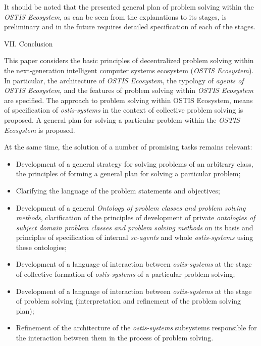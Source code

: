 \documentclass[9pt, letterpaper]{article}
\begin{document}
\begin{spacing}{0.97}
\begin{multicols}
It should be noted that the presented general plan of
problem solving within the \textit{OSTIS Ecosystem}, as can be
seen from the explanations to its stages, is preliminary
and in the future requires detailed specification of each
of the stages.

\begin{center}
   VII. Conclusion 
\end{center}

This paper considers the basic principles of decentralized problem solving within the next-generation intelligent computer systems ecosystem (\textit{OSTIS Ecosystem}).
In particular, the architecture of \textit{OSTIS Ecosystem}, the
typology of\textit{ agents of OSTIS Ecosystem}, and the features
of problem solving within \textit{OSTIS Ecosystem} are specified.
The approach to problem solving within OSTIS Ecosystem, means of specification of \textit{ostis-systems} in the context
of collective problem solving is proposed. A general
plan for solving a particular problem within the \textit{OSTIS
Ecosystem} is proposed.

At the same time, the solution of a number of promising tasks remains relevant:
\begin{itemize}
    \item Development of a general strategy for solving problems of an arbitrary class, the principles of forming
a general plan for solving a particular problem;
    \item Clarifying the language of the problem statements
and objectives;
    \item Development of a general \textit{Ontology of problem
classes and problem solving methods}, clarification
of the principles of development of private \textit{ontologies of subject domain problem classes and problem
solving methods} on its basis and principles of specification of internal \textit{sc-agents} and whole \textit{ostis-systems}
using these ontologies;
    \item Development of a language of interaction between
\textit{ostis-systems} at the stage of collective formation of
\textit{ostis-systems }of a particular problem solving;
    \item Development of a language of interaction between
\textit{ostis-systems }at the stage of problem solving (interpretation and refinement of the problem solving
plan);
    \item Refinement of the architecture of the\textit{ ostis-systems}
subsystems responsible for the interaction between
them in the process of problem solving.
\end{itemize}


\end{multicols}
\end{spacing}
\end{document}

